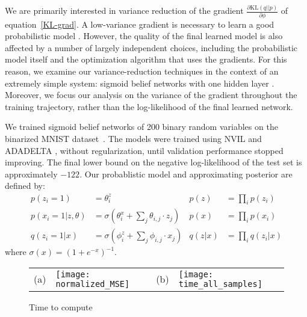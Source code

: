 \documentclass{article} %
\def\KL{\text{KL}}
\begin{document}
We are primarily interested in variance reduction of the gradient $\frac{\partial \KL (q || p)}{\partial \phi}$ of equation~\ref{KL-grad}.  A low-variance gradient is necessary to learn a good probabilistic model \cite{paisley2012variational, mnih2014neural}.  However, the quality of the final learned model is also affected by a number of largely independent choices, including the probabilistic model itself and the optimization algorithm that uses the gradients.  For this reason, we examine our variance-reduction techniques in the context of an extremely simple system: sigmoid belief networks with one hidden layer \cite{neal1992connectionist}.  Moreover, we focus our analysis on the variance of the gradient throughout the training trajectory, rather than the log-likelihood of the final learned network.

We trained sigmoid belief networks of 200 binary random variables on the binarized MNIST dataset~\cite{salakhutdinov2008quantitative}.  The models were trained using NVIL \cite{mnih2014neural} and ADADELTA \cite{zeiler2012adadelta}, without regularization, until validation performance stopped improving.  The final lower bound on the negative log-likelihood of the test set is approximately $-122$.
Our probablistic model and approximating posterior are defined by:
\begin{align*}
p(z_i = 1) &= \theta_i^z &
p(z) &= \prod_i p(z_i) \\
p(x_i=1 |z, \theta) &= \sigma \left( \theta_i^x + \sum_j \theta_{i,j} \cdot z_j \right) &
p(x) &= \prod_i p(x_i) \\
q(z_i = 1 | x) &= \sigma \left( \phi_i^z + \sum_j \phi_{i,j} \cdot x_j \right) &
q(z | x) &= \prod_i q(z_i | x)
\end{align*}
where $\sigma(x) = (1 + e^{-x})^{-1}$.


\begin{figure}[tbh]
  \begin{center}
    \begin{tabular}{p{0.0in}p{2.25in}p{0.0in}p{2.25in}}
      \parbox[b]{0in}{(a) \vspace{3.5cm}} & \texttt{[image: normalized\_MSE]} & 
      \parbox[b]{0in}{(b) \vspace{3.5cm}} & \texttt{[image: time\_all\_samples]}  %
    \end{tabular}
  \end{center}
  \caption{Time to compute  \label{time_all_samples}} 
\end{figure}
\end{document}
